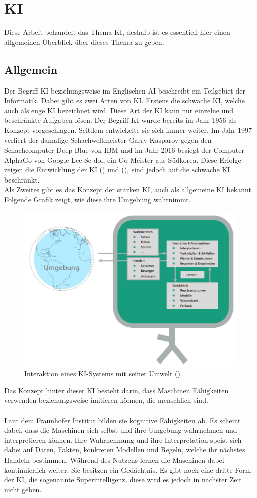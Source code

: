 \documentclass[12pt,toc=bib,toc=listof]{scrreprt}
\begin{document}
\section{KI} %
\label{sec:KI}
Diese Arbeit behandelt das Thema KI, deshalb ist es essentiell hier einen allgemeinen Überblick über dieses Thema zu geben.

\subsection{Allgemein} %
\label{sec:allgemein}
Der Begriff KI beziehungsweise im Englischen AI beschreibt ein Teilgebiet der Informatik. Dabei gibt es zwei Arten von KI. Erstens die schwache KI, welche auch als enge KI bezeichnet wird. Diese Art der KI kann nur einzelne und beschränkte Aufgaben lösen. Der Begriff KI wurde bereits im Jahr 1956 als Konzept vorgeschlagen. Seitdem entwickelte sie sich immer weiter. Im Jahr 1997 verliert der damalige Schachweltmeister Garry Kasparov gegen den Schachcomputer Deep Blue von IBM und im Jahr 2016 besiegt der Computer AlphaGo von Google Lee Se-dol, ein Go-Meister aus Südkorea. Diese Erfolge zeigen die Entwicklung der KI (\cite{Hecker2018}) und (\cite{Roscher2025}), sind jedoch auf die schwache KI beschränkt.\\
Als Zweites gibt es das Konzept der starken KI, auch als allgemeine KI bekannt. Folgende Grafik zeigt, wie diese ihre Umgebung wahrnimmt.
\begin{figure} [H]
    \centering
    \includegraphics[width=0.75\linewidth]{./Bilder/Fraunhofer_KI-Umgebung.png}
    \caption{Interaktion eines KI-Systems mit seiner Umwelt (\cite{Hecker2018})}
    \label{fig:enter-label}
\end{figure}
\noindent Das Konzept hinter dieser KI besteht darin, dass Maschinen Fähigkeiten verwenden beziehungsweise imitieren können, die menschlich sind.\\
\\
Laut dem Fraunhofer Institut bilden sie kognitive Fähigkeiten ab.
Es scheint dabei, dass die Maschinen sich selbst und ihre Umgebung wahrnehmen und interpretieren können. Ihre Wahrnehmung und ihre Interpretation speist sich dabei auf Daten, Fakten, konkreten Modellen und Regeln, welche ihr nächstes Handeln bestimmen. Während des Nutzens lernen die Maschinen dabei kontinuierlich weiter. Sie besitzen ein Gedächtnis. Es gibt noch eine dritte Form der KI, die sogenannte Superintelligenz, diese wird es jedoch in nächster Zeit nicht geben.
\end{document}
